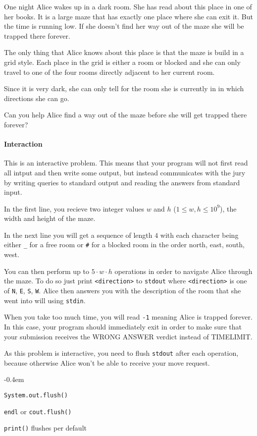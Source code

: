 



\makeheader

One night Alice wakes up in a dark room. She has read about this place in one of her books. It is a large maze that has exactly one place where she can exit it. But the time is running low. If she doesn't find her way out of the maze she will be trapped there forever.

The only thing that Alice knows about this place is that the maze is build in a grid style. Each place in the grid is either a room or blocked and she can only travel to one of the four rooms directly adjacent to her current room.

Since it is very dark, she can only tell for the room she is currently in in which directions she can go.

Can you help Alice find a way out of the maze before she will get trapped there forever?

\paragraph*{Interaction}

This is an interactive problem. This means that your program will not first
read all intput and then write some output, but instead communicates with
the jury by writing queries to standard output and reading the answers from
standard input.

In the first line, you recieve two integer values $w$ and $h$ ($1\leq w, h \leq 10^9$), the width and height of the maze.

In the next line you will get a sequence of length $4$ with each character being either \texttt{\_} for a free room or \texttt{\#} for a blocked room in the order north, east, south, west.

You can then perform up to $5 \cdot w \cdot h$ operations in order to navigate Alice through the maze. To do so just print \texttt{<direction>} to \texttt{stdout} where \texttt{<direction>} is one of \texttt{N}, \texttt{E}, \texttt{S}, \texttt{W}. Alice then answers you with the description of the room that she went into will using \texttt{stdin}. 

When you take too much time, you will read \texttt{-1} meaning Alice is trapped forever. In this case, your program should immediately exit in order to make sure that your submission receives the WRONG ANSWER verdict instead of TIMELIMIT.

As this problem is interactive, you need to flush \texttt{stdout} after each operation, because otherwise Alice won't be able to receive your move request.
\begin{description}
	\itemsep-0.4em
	\item[Java:] \texttt{System.out.flush()}
	\item[C++:] \texttt{endl} or \texttt{cout.flush()}
  \item[Python] \texttt{print()} flushes per default
\end{description}

